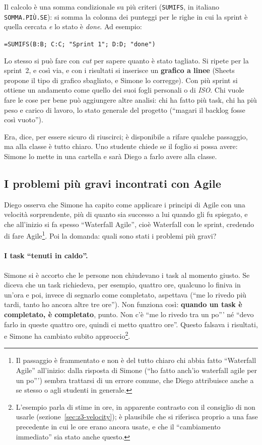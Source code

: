 Il calcolo è una somma condizionale su più criteri (\texttt{SUMIFS}, in
italiano \texttt{SOMMA.PIÙ.SE}): si somma la colonna dei punteggi per le
righe in cui la sprint è quella cercata \emph{e} lo stato è \emph{done}. Ad
esempio:
\begin{center}
  \texttt{=SUMIFS(B:B; C:C; "Sprint 1"; D:D; "done")}
\end{center}
Lo stesso si può fare con \emph{cut} per sapere quanto è stato tagliato. Si
ripete per la sprint~2, e così via, e con i risultati si inserisce un
\textbf{grafico a linee} (Sheets propone il tipo di grafico sbagliato, e
Simone lo corregge). Con più sprint si ottiene un andamento come quello dei
suoi fogli personali o di \emph{ISO}. Chi vuole fare le cose per bene può
aggiungere altre analisi: chi ha fatto più task, chi ha più peso e carico di
lavoro, lo stato generale del progetto (``magari il backlog fosse così
vuoto'').

Era, dice, per essere sicuro di riuscirci; è disponibile a rifare qualche
passaggio, ma alla classe è tutto chiaro. Uno studente chiede se il foglio si
possa avere: Simone lo mette in una cartella e sarà Diego a farlo avere alla
classe.

\subsection{I problemi più gravi incontrati con Agile}

Diego osserva che Simone ha capito come applicare i principi di Agile con una
velocità sorprendente, più di quanto sia successo a lui quando gli fu
spiegato, e che all'inizio si fa spesso ``Waterfall Agile'', cioè Waterfall
con le sprint, credendo di fare Agile\footnote{Il passaggio è frammentato e non
è del tutto chiaro chi abbia fatto ``Waterfall Agile'' all'inizio: dalla
risposta di Simone (``ho fatto anch'io waterfall agile per un po''') sembra
trattarsi di un errore comune, che Diego attribuisce anche a se stesso o agli
studenti in generale.}. Poi la domanda: quali sono stati i problemi più gravi?

\paragraph{I task ``tenuti in caldo''.} Simone si è accorto che le persone non
chiudevano i task al momento giusto. Se diceva che un task richiedeva, per
esempio, quattro ore, qualcuno lo finiva in un'ora e poi, invece di segnarlo
come completato, aspettava (``me lo rivedo più tardi, tanto ho ancora altre
tre ore''). Non funziona così: \textbf{quando un task è completato, è
completato}, punto. Non c'è ``me lo rivedo tra un po''' né ``devo farlo in
queste quattro ore, quindi ci metto quattro ore''. Questo falsava i risultati,
e Simone ha cambiato subito approccio\footnote{L'esempio parla di stime in
ore, in apparente contrasto con il consiglio di non usarle
(sezione~\ref{sec:z3-velocity}); è plausibile che si riferisca proprio a una
fase precedente in cui le ore erano ancora usate, e che il ``cambiamento
immediato'' sia stato anche questo.}.

